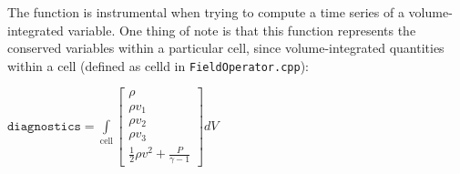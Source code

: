 \documentclass{article}
\begin{document}
\begin{itemize}
The function is instrumental when trying to compute a time series of a volume-integrated variable. One thing of note is that this function represents the conserved variables within a particular cell, since volume-integrated quantities within a cell (defined as celld in \texttt{FieldOperator.cpp}):

$\texttt{diagnostics}=\int\limits_{\text{cell}} \left[\begin{smallmatrix}
	\rho \\
	\rho v_1 \\
	\rho v_2 \\
	\rho v_3 \\
	\frac{1}{2}\rho v^2 + \frac{P}{\gamma - 1}  
\end{smallmatrix} \right] dV$

 
\end{itemize}
 
\end{document}
